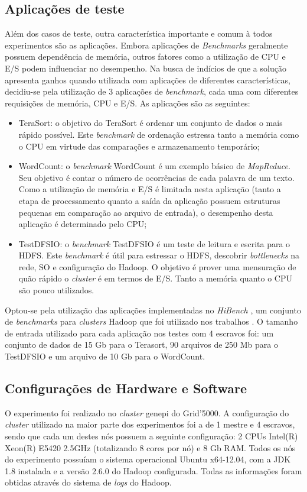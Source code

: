 \subsection{Aplicações de teste}
\label{sec:aplicacoes}
Além dos casos de teste, outra característica importante e comum à todos experimentos são as aplicações. Embora aplicações de \textit{Benchmarks} geralmente possuem dependência de memória, outros fatores como a utilização de CPU e E/S podem influenciar no desempenho. Na busca de indícios de que a solução apresenta ganhos quando utilizada com aplicações de diferentes características, decidiu-se pela utilização de 3 aplicações de \textit{benchmark}, cada uma com diferentes requisições de memória, CPU e E/S. As aplicações são as seguintes:

\begin{itemize}
	\item TeraSort: o objetivo do TeraSort \citep{TeraSort2008} é ordenar um conjunto de dados o mais rápido possível. Este \textit{benchmark} de ordenação estressa tanto a memória como o CPU em virtude das comparações e armazenamento temporário;
	\item WordCount: o \textit{benchmark} WordCount é um exemplo básico de \textit{MapReduce}. Seu objetivo é contar o número de ocorrências de cada palavra de um texto. Como a utilização de memória e E/S é limitada nesta aplicação (tanto a etapa de processamento quanto a saída da aplicação possuem estruturas pequenas em comparação ao arquivo de entrada), o desempenho desta aplicação é determinado pelo CPU;
	\item TestDFSIO: o \textit{benchmark} TestDFSIO é um teste de leitura e escrita para o HDFS. Este \textit{benchmark} é útil para estressar o HDFS, descobrir \textit{bottlenecks} na rede, SO e configuração do Hadoop. O objetivo é prover uma mensuração de quão rápido o \textit{cluster} é em termos de E/S. Tanto a memória quanto o CPU são pouco utilizados.
\end{itemize}

Optou-se pela utilização das aplicações implementadas no \textit{HiBench} \cite{HiBench}, um conjunto de \textit{benchmarks} para \textit{clusters} Hadoop que foi utilizado nos trabalhos \cite{HBA} \cite{HBB} \cite{HBC}. O tamanho de entrada utilizado para cada aplicação nos testes com 4 escravos foi: um conjunto de dados de 15 Gb para o Terasort, 90 arquivos de 250 Mb para o TestDFSIO e um arquivo de 10 Gb para o WordCount. 

\subsection{Configurações de Hardware e Software}
O experimento foi realizado no \textit{cluster} genepi do Grid'5000. A configuração do \textit{cluster} utilizado na maior parte dos experimentos foi a de 1 mestre e 4 escravos, sendo que cada um destes nós possuem a seguinte configuração: 2 CPUs Intel(R) Xeon(R) E5420 2.5GHz (totalizando 8 cores por nó) e 8 Gb RAM. Todos os nós do experimento possuíam o sistema operacional Ubuntu x64-12.04, com a JDK 1.8 instalada e a versão 2.6.0 do Hadoop configurada. Todas as informações foram obtidas através do sistema de \textit{logs} do Hadoop.

